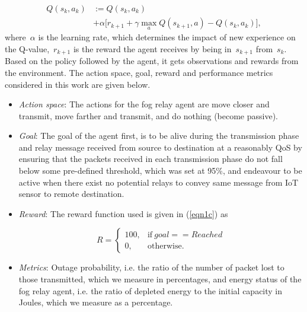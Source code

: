 \documentclass[journal]{IEEEtran}
\begin{document}
\begin{equation}\label{eqn1b}
\begin{split}
Q(s_k, a_k) &:= Q(s_k, a_k)\\
& + \alpha \Big[ r_{k + 1} + \gamma \max_{a}  Q(s_{k + 1}, a) -  Q(s_k, a_k) \Big],
   \end{split}
\end{equation}
where~$\alpha$ is the learning rate, which determines the impact of new experience on the Q-value,~$r_{k + 1}$ is the reward the agent receives by being in~$s_{k + 1}$ from~$s_{k}$. Based on the policy followed by the agent, it gets observations and rewards from the environment. The action space, goal, reward and performance metrics considered in this work are given below.

\begin{itemize}
  \item \emph{Action space}: The actions for the fog relay agent are move closer and transmit, move farther and transmit, and do nothing (become passive).
  \item \emph{Goal}: The goal of the agent first, is to be alive during the transmission phase and relay message received from source to destination at a reasonably QoS by ensuring that the packets received in each transmission phase do not fall below some pre-defined threshold, which was set at 95\%, and endeavour to be active when there exist no potential relays to convey same message from IoT sensor to remote destination.
  \item \emph{Reward}: The reward function used is given in (\ref{eqn1c}) as

 \begin{equation}\label{eqn1c}
    R =
    \begin{cases}
      100, & \text{if}\ goal==Reached \\
      0, & \text{otherwise.}
    \end{cases}
  \end{equation}
  \item \emph{Metrics}: Outage probability, i.e. the ratio of the number of packet lost to those transmitted, which we measure in percentages, and energy status of the fog relay agent, i.e. the ratio of depleted energy to the initial capacity in Joules, which we measure as a percentage.
\end{itemize}
\end{document}
